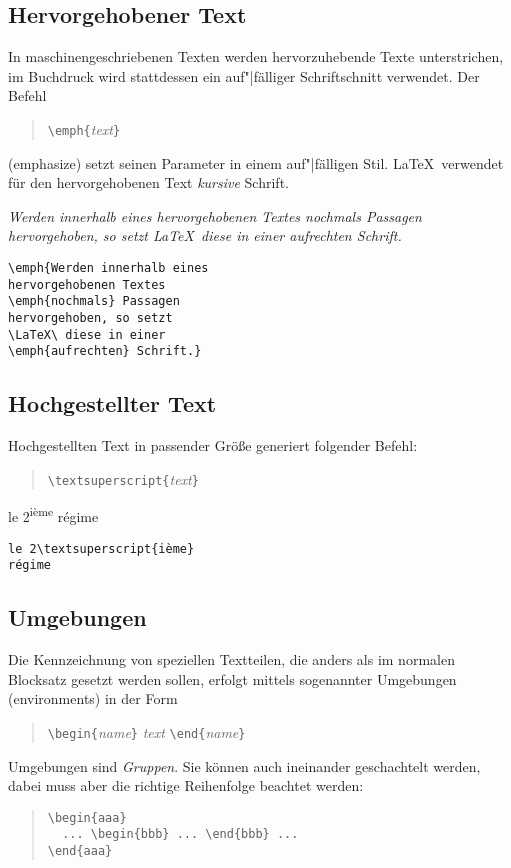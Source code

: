  
 
\subsection{Hervorgehobener Text}
 
In maschinengeschriebenen Texten werden hervorzuhebende Texte
unterstrichen, im Buchdruck wird stattdessen ein auf"|fälliger
Schriftschnitt verwendet.
Der Befehl 
\begin{quote}
\verb|\emph{|\textit{text}\verb|}| 
\end{quote}
(emphasize) setzt seinen Parameter in einem auf"|fälligen Stil.
\LaTeX\ verwendet für den hervorgehobenen Text \textit{kursive}
Schrift.

\exa 
\emph{Werden innerhalb eines hervorgehobenen Textes
\emph{nochmals} Passagen hervorgehoben, so setzt \LaTeX\ diese in
einer \emph{aufrechten} Schrift.}
\exb
\begin{verbatim}
\emph{Werden innerhalb eines 
hervorgehobenen Textes 
\emph{nochmals} Passagen
hervorgehoben, so setzt
\LaTeX\ diese in einer 
\emph{aufrechten} Schrift.}
\end{verbatim}
\exc


\subsection{Hochgestellter Text}
Hochgestellten Text in passender Größe generiert folgender Befehl:
\begin{quote}
\verb|\textsuperscript{|\textit{text}\verb|}|
\end{quote}
\exa
le 2\textsuperscript{ième} régime
\exb
\begin{verbatim}
le 2\textsuperscript{ième}
régime
\end{verbatim}
\exc




\subsection{Umgebungen} \label{env}

Die Kennzeichnung von speziellen Textteilen, die anders als im
normalen Blocksatz gesetzt werden sollen, erfolgt mittels
sogenannter Umgebungen (environments) in der Form
\begin{quote}
\verb|\begin{|\textit{name}\verb|}|\quad
   \textit{text}\quad
   \verb|\end{|\textit{name}\verb|}|
\end{quote}
Umgebungen sind \emph{Gruppen}.
Sie können auch ineinander geschachtelt werden, dabei muss aber
die richtige Reihenfolge beachtet werden:
\begin{quote}
\verb|\begin{aaa}|\\
\verb|  ... \begin{bbb} ... \end{bbb} ... |\\
\verb|\end{aaa}|
\end{quote}


